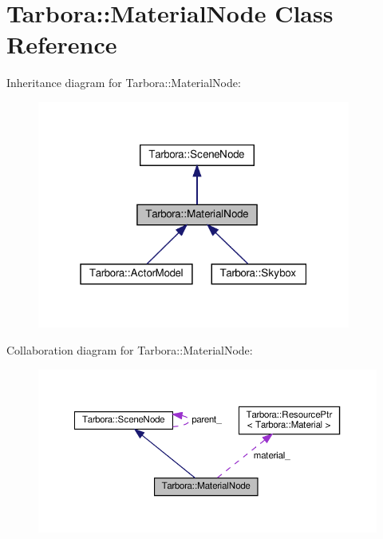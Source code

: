 \hypertarget{classTarbora_1_1MaterialNode}{}\section{Tarbora\+:\+:Material\+Node Class Reference}
\label{classTarbora_1_1MaterialNode}


Inheritance diagram for Tarbora\+:\+:Material\+Node\+:
\nopagebreak
\begin{figure}[H]
\begin{center}
\leavevmode
\includegraphics[width=292pt]{classTarbora_1_1MaterialNode__inherit__graph}
\end{center}
\end{figure}


Collaboration diagram for Tarbora\+:\+:Material\+Node\+:
\nopagebreak
\begin{figure}[H]
\begin{center}
\leavevmode
\includegraphics[width=350pt]{classTarbora_1_1MaterialNode__coll__graph}
\end{center}
\end{figure}
